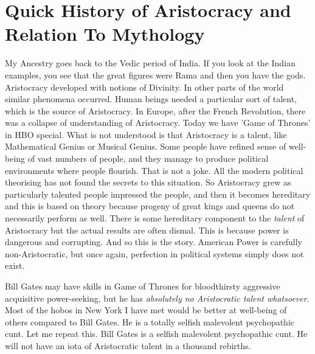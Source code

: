 \documentclass{amsart}
\begin{document}
\section{Quick History of Aristocracy and Relation To Mythology}

My Ancestry goes back to the Vedic period of India.  If you look at the Indian examples, you see that the great figures were Rama and then you have the gods.  Aristocracy developed with notions of Divinity.  In other parts of the world similar phenomena occurred.  Human beings needed a particular sort of talent, which is the source of Aristocracy.  In Europe, after the French Revolution, there was a collapse of understanding of Aristocracy.  Today we have 'Game of Thrones' in HBO special.  What is not understood is that Aristocracy is a talent, like Mathematical Genius or Musical Genius.  Some people have refined sense of well-being of vast numbers of people, and they manage to produce political environments where people flourish.  That is not a joke.  All the modern political theorising has not found the secrets to this situation.  So Aristocracy grew as particularly talented people impressed the people, and then it becomes hereditary and this is based on theory because progeny of great kings and queens do not necessarily perform as well.  There is some hereditary component to the {\em talent} of Aristocracy but the actual results are often dismal.  This is because power is dangerous and corrupting.  And so this is the story.  American Power is carefully non-Aristocratic, but once again, perfection in political systems simply does not exist.  

Bill Gates may have skills in Game of Thrones for bloodthirsty aggressive acquisitive power-seeking, but he has {\em absolutely no Aristocratic talent whatsoever}.  Most of the hobos in New York I have met would be better at well-being of others compared to Bill Gates.  He is a totally selfish malevolent psychopathic cunt.  Let me repeat this.  Bill Gates is a selfish malevolent psychopathic cunt.  He will not have an iota of Aristocratic talent in a thousand rebirths.
 
\end{document}

